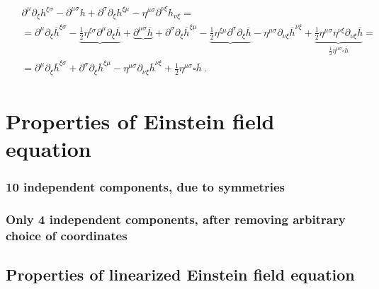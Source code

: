 \documentclass[letterpaper,10pt,english]{jupyterBook}
\begin{document}
\begin{equation}\label{equation:ch/relativity-general/linearized-efe:eq:efe-linearization:non-laplacian}
\begin{split}\begin{aligned}
  & \partial^{\mu} \partial_{\xi} h^{\xi \sigma} - \partial^{\mu \sigma} h + \partial^{\sigma} \partial_{\xi} h^{\xi \mu} - \eta^{\mu \sigma} \partial^{\nu \xi} h_{\nu \xi} = \\
  & = \partial^{\mu} \partial_{\xi} \overline{h}^{\xi \sigma} - \underbrace{ \frac{1}{2} \eta^{\xi \sigma} \partial^{\mu} \partial_{\xi} \overline{h}}_{} + \underbrace{ \partial^{\mu \sigma} \overline{h} }_{} + \partial^{\sigma} \partial_{\xi} \overline{h}^{\xi \mu} - \underbrace{ \frac{1}{2} \eta^{\xi \mu} \partial^{\sigma} \partial_{\xi} \overline{h} }_{} - \eta^{\mu \sigma} \partial_{\nu \xi} \overline{h}^{\nu \xi} + \underbrace{ \frac{1}{2} \eta^{\mu \sigma} \eta^{\nu \xi} \partial_{\nu \xi} \overline{h} }_{ \frac{1}{2} \eta^{\mu \sigma} \square \overline{h} } =  \\
  & = \partial^{\mu} \partial_{\xi} \overline{h}^{\xi \sigma} + \partial^{\sigma} \partial_{\xi} \overline{h}^{\xi \mu} - \eta^{\mu \sigma} \partial_{\nu \xi} \overline{h}^{\nu \xi} + \frac{1}{2} \eta^{\mu \sigma} \square \overline{h} \ .
\end{aligned}\end{split}
\end{equation}
\sphinxstepscope


\section{Properties of Einstein field equation}
\label{\detokenize{ch/relativity-general/efe-properties:properties-of-einstein-field-equation}}\label{\detokenize{ch/relativity-general/efe-properties:relativity-general-notes-einstein-equation-properties}}\label{\detokenize{ch/relativity-general/efe-properties::doc}}\subsubsection*{10 independent components, due to symmetries}
\subsubsection*{Only 4 independent components, after removing arbitrary choice of coordinates}


\subsection{Properties of linearized Einstein field equation}
\label{\detokenize{ch/relativity-general/efe-properties:properties-of-linearized-einstein-field-equation}}\label{\detokenize{ch/relativity-general/efe-properties:relativity-general-notes-einstein-equation-properties-linear}}
\sphinxstepscope
\end{document}
